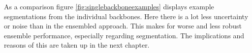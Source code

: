 

As a comparison figure \ref{fig:singlebackboneexamples} displays example segmentations from the individual backbones. Here there is a lot less uncertainty or 
noise than in the ensembled approach. This makes for worse and less robust ensemble performance, especially regarding segmentation. 
The implications and reasons of this are taken up in the next chapter.






